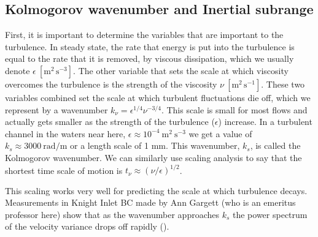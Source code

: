 \documentclass[11pt]{article}
\begin{document}
\subsection[Kolmogrov scale]{Kolmogorov wavenumber and Inertial subrange}

First, it is important to determine the variables that are important to the
turbulence.  In steady state, the  rate that energy is put into the turbulence
is equal to the rate that it is removed, by viscous dissipation, which we
usually denote $\epsilon \ \mathrm{[m^2\,s^{-3}]}$.  The other variable that
sets the scale at which viscosity overcomes the turbulence is the strength of
the viscosity $\nu \ \mathrm{[m^2\, s^{-1}]}$.  These two variables combined
set the scale at which turbulent fluctuations die off, which we represent by a
wavenumber $k_{\nu} = \epsilon^{1/4}\nu^{-3/4}$.   This scale is small for most
flows and actually gets smaller as the strength of the turbulence ($\epsilon$)
increase.  In a turbulent channel in the waters near here,
$\epsilon\approx10^{-4}\ \mathrm{m^2\  s^{-3}}$ we get a value of $k_{s}
\approx 3000\ \mathrm{rad/m}$ or a length scale of 1 mm. This wavenumber,
$k_s$, is called the Kolmogorov wavenumber.   We can similarly use scaling
analysis to say that the shortest time scale of motion is $t_{\nu} \approx (\nu
/ \epsilon)^{1/2}$.  

This scaling works very well for predicting the scale at which turbulence
decays.  Measurements in Knight Inlet BC made by Ann Gargett (who is an
emeritus professor here) show that as the wavenumber approaches $k_s$ the power
spectrum of the velocity variance drops off rapidly
().  
\end{document}
